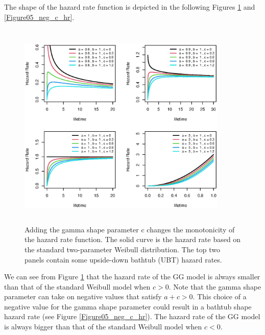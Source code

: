 \documentclass{ps}
\theoremstyle{plain}%
\theoremstyle{definition}
\theoremstyle{remark}
\begin{document}
The shape of the hazard rate function is depicted in the following Figures \ref{Figure04_pos_c_hr} and \ref{Figure05_neg_c_hr}.

\begin{figure}[h!]
	\centering	\includegraphics[width=10cm,height=10cm]{Figure04_pos_c_hr.eps}
	\caption{Adding the gamma shape parameter c changes the monotonicity of the hazard rate function. The solid curve is the hazard rate based on the standard two-parameter Weibull distribution. The top two panels contain some upside-down bathtub (UBT) hazard rates.}
	\label{Figure04_pos_c_hr}
\end{figure}

We can see from Figure \ref{Figure04_pos_c_hr} that the hazard rate of the GG model is always smaller than that of the standard Weibull model when $c > 0$. Note that the gamma shape parameter can take on negative values that satisfy $a + c > 0$. This choice of a negative value for the gamma shape parameter could result in a bathtub shape hazard rate (see Figure \ref{Figure05_neg_c_hr}). The hazard rate of the GG model is always bigger than that of the standard Weibull model when $c < 0$.
\end{document}
